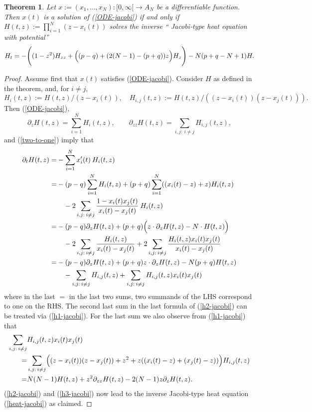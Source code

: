 \documentclass[reqno]{amsart}
\theoremstyle{plain}
\newtheorem{theorem}{Theorem}[section]
\theoremstyle{definition}
\numberwithin{equation}{section}
\begin{document}
 \begin{theorem}\label{heat-equation-jacobi}
  Let $x:=(x_1,\ldots,x_N):[0,\infty[\to A_N$ be a differentiable function.
      Then  $x(t)$ is a solution of (\ref{ODE-jacobi})
      if and only if  $H(t,z):=\prod_{i=1}^N (z-x_i(t))$
      solves the inverse `` Jacobi-type heat equation with potential''
 \begin{equation}\label{heat-jacobi}
   H_t=  -\Biggl( (1-z^2) H_{zz}+ \Bigl( (p-q)+(2(N-1)-(p+q))z\Bigr) H_{z} \Biggr) -N(p+q-N+1)H.
   \end{equation}
 \end{theorem}


 \begin{proof}
   Assume first that $x(t)$ satisfies  (\ref{ODE-jacobi}).
   Consider $H$ as defined in the theorem, and, for $i\ne j$,
   \begin{equation}\label{def-h-jacobi}  H_i(t,z):=H(t,z)/(z-x_i(t)), \quad
     H_{i,j}(t,z):=H(t,z)/((z-x_i(t))(z-x_j(t))). \end{equation}
   Then (\ref{ODE-jacobi}),
   \begin{equation}\label{h1-jacobi} 
 \partial_z H(t,z)=\sum_{i=1}^N H_i(t,z), \quad\quad 
 \partial_{zz} H(t,z)=\sum_{i,j: \> i\ne j} H_{i,j}(t,z), \end{equation}
and (\ref{two-to-one})  imply that
\begin{align}\label{h2-jacobi}
  \partial_t H(t,z)=&    -\sum_{i=1}^N x_i^\prime(t) \> H_i(t,z)\\
     =& -(p-q)\sum_{i=1}^N H_i(t,z)+(p+q) \sum_{i=1}^N ((x_i(t)-z)+z)H_i(t,z)\notag\\
&\quad -2\sum_{i,j: \> i\ne j} \frac{1-x_i(t)x_j(t)}{x_i(t)-x_j(t)}\> H_i(t,z)\notag\\
 =& -(p-q)\partial_z H(t,z)+(p+q) \Bigl( z\cdot\partial_z H(t,z)-N\cdot H(t,z)\Bigr)\notag\\
&\quad -2\sum_{i,j: \> i\ne j}\frac{H_i(t,z)}{x_i(t)-x_j(t)} +2 \sum_{i,j: \> i\ne j}
\frac{H_i(t,z)x_i(t)x_j(t)}{x_i(t)-x_j(t)}\notag\\
 =& -(p-q)\partial_z H(t,z)+(p+q) z\cdot\partial_z H(t,z)- N(p+q)H(t,z)\notag\\
&\quad  -\sum_{i,j: \> i\ne j}  H_{i,j}(t,z)+ \sum_{i,j: \> i\ne j} H_{i,j}(t,z)x_i(t)x_j(t)\notag
\end{align}
where in the last $=$ in the last two sums, two summands of the LHS correspond to one on the RHS.
The second last sum in the last formula of (\ref{h2-jacobi}) can be treated via (\ref{h1-jacobi}).  For the last sum we also
observe from  (\ref{h1-jacobi}) that
\begin{align}\label{h3-jacobi}
\sum_{i,j: \> i\ne j} &H_{i,j}(t,z)x_i(t)x_j(t)\\
=&\sum_{i,j: \> i\ne j}\Bigl( (z-x_i(t))(z-x_j(t))+z^2 +z((x_i(t)-z)+(x_j(t)-z))\Bigr)  H_{i,j}(t,z)\notag\\
=& N(N-1) H(t,z)+ z^2 \partial_{zz}H(t,z)-2(N-1)z\partial_z H(t,z).
\notag\end{align}
  (\ref{h2-jacobi}) and (\ref{h3-jacobi}) now lead to the inverse Jacobi-type heat equation
(\ref{heat-jacobi}) as claimed.


\end{proof}
\end{document}

